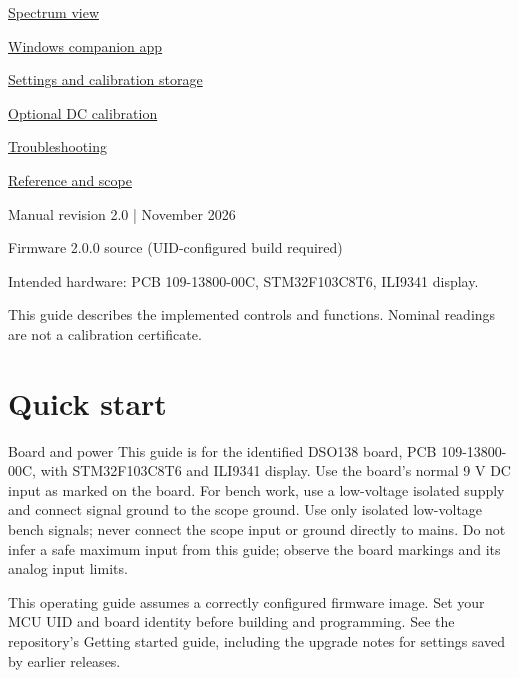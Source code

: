 \documentclass[10pt,a4paper]{article}
\newcommand{\manualpage}[2]{\clearpage\section{#1}\label{#2}}
\newcommand{\coverlink}[2]{\hyperref[#1]{#2}\hfill
  {\color{muted}\pageref*{#1}}}
\begin{document}
\begin{minipage}[t]{0.47\linewidth}
  \coverlink{spectrum}{Spectrum view}\par
  \coverlink{usb}{Windows companion app}\par
  \coverlink{storage}{Settings and calibration storage}\par
  \coverlink{calibration}{Optional DC calibration}\par
  \coverlink{troubleshooting}{Troubleshooting}\par
  \coverlink{reference}{Reference and scope}\par
\end{minipage}
\vfill
{\small\color{muted}
  Manual revision 2.0 \enspace| November 2026\par
Firmware 2.0.0 source (UID-configured build required)\par
Intended hardware: PCB 109-13800-00C, STM32F103C8T6, ILI9341 display.\par
This guide describes the implemented controls and functions.
Nominal readings are not a calibration certificate.}

\manualpage{Quick start}{quickstart}

\begin{manualnote}{Board and power}
This guide is for the identified DSO138 board, PCB 109-13800-00C, with STM32F103C8T6 and ILI9341 display. Use the board's normal 9 V DC input as marked on the board. For bench work, use a low-voltage isolated supply and connect signal ground to the scope ground. Use only isolated low-voltage bench signals; never connect the scope input or ground directly to mains. Do not infer a safe maximum input from this guide; observe the board markings and its analog input limits.
\end{manualnote}

This operating guide assumes a correctly configured firmware image. Set your MCU UID and board identity before building and programming. See the repository's Getting started guide, including the upgrade notes for settings saved by earlier releases.
\end{document}
